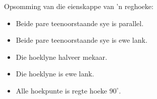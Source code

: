 


Opsomming van die eienskappe van 'n reghoeke:\par 
\begin{itemize}[noitemsep]
\item Beide pare teenoorstaande sye is parallel.
\item Beide pare teenoorstaande sye is ewe lank.
\item Die hoeklyne halveer mekaar.
\item Die hoeklyne is ewe lank.
\item Alle hoekpunte is regte hoeke $90^{\circ}$.
\end{itemize}

